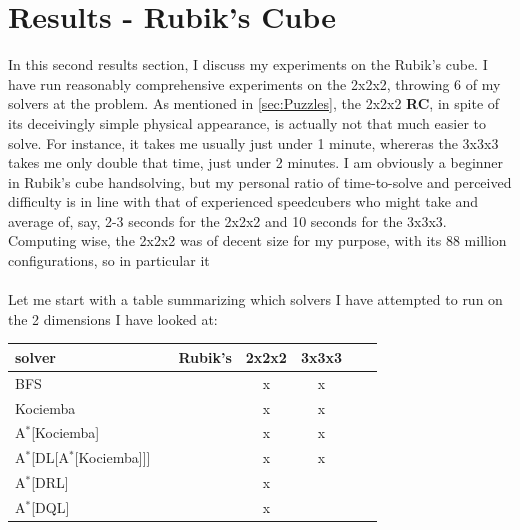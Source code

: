 
\chapter{Results - Rubik's Cube} %

\label{sec:ResRubiks} %


In this second results section, I discuss my experiments on the Rubik's cube. I have run reasonably comprehensive experiments on the 2x2x2, throwing 6 of my solvers at the problem. As mentioned in \ref{sec:Puzzles}, the 2x2x2 \textbf{RC}, in spite of its deceivingly simple physical appearance, is actually not that much easier to solve. For instance, it takes me usually just under 1 minute, whereras the 3x3x3 takes me only double that time, just under 2 minutes. I am obviously a beginner in Rubik's cube handsolving, but my personal ratio of time-to-solve and perceived difficulty is in line with that of experienced speedcubers who might take and average of, say, 2-3 seconds for the 2x2x2 and 10 seconds for the 3x3x3.
\\
Computing wise, the 2x2x2 was of decent size for my purpose, with its 88 million configurations, so in particular it 
\\
\\
Let me start with a table summarizing which solvers I have attempted to run on the 2 dimensions I have looked at:

\begin{center}
\begin{tabular}{l*{5}{c}r}
\hline
\textbf{solver}      & & \textbf{Rubik's} & \textbf{2x2x2} & \textbf{3x3x3} \\
\hline
BFS   &   &        &  x  &  x  \\
\hline
Kociemba   &   &      &  x  &  x  \\
\hline
A$^{*}$[Kociemba]  &   &  &  x  &  x  \\
\hline
A$^{*}$[DL[A$^{*}$[Kociemba]]]  &   &  &  x  &  x  \\
\hline
A$^{*}$[DRL]  &   &  &  x  &  \\
\hline
A$^{*}$[DQL]  &   &  &  x  &  \\
\hline
\end{tabular}
\end{center}








